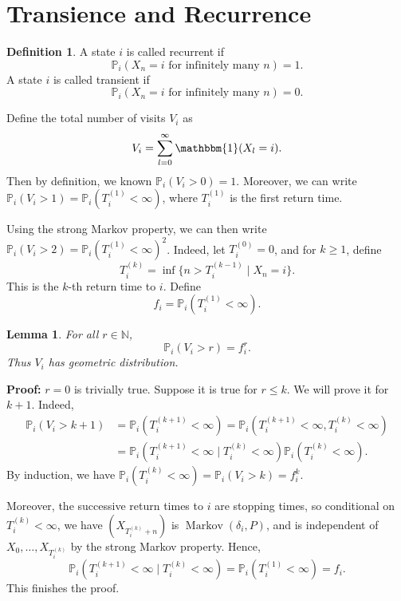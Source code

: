 \documentclass[12pt]{article}
\DeclareMathOperator{\Mkv}{Markov}
\newtheorem{lemma}{Lemma}[section]
\theoremstyle{definition}
\newtheorem{definition}{Definition}[section]
\theoremstyle{remark}
\begin{document}
\section{Transience and Recurrence}%
\label{sec:transience_and_recurrence}

\begin{definition}
	A state $i$ is called recurrent if
	\[
		\mathbb{P}_i(X_n = i \text{ for infinitely many } n) = 1
	.\]
	A state $i$ is called transient if
	\[
		\mathbb{P}_i(X_n = i \text{ for infinitely many } n) = 0
	.\]
\end{definition}

Define the total number of visits $V_i$ as
\[
	V_i = \sum_{l = 0}^{\infty} \mathbbm{1}(X_l = i)
.\]
Then by definition, we known $\mathbb{P}_i(V_i > 0) = 1$. Moreover, we can write $\mathbb{P}_i(V_i > 1) = \mathbb{P}_i(T_i^{(1)} < \infty)$, where $T_i^{(1)}$ is the first return time.

Using the strong Markov property, we can then write $\mathbb{P}_i(V_i > 2) = \mathbb{P}_i(T_i^{(1)} < \infty)^2$. Indeed, let $T_i^{(0)} = 0$, and for $k \geq 1$, define 
\[
	T_i^{(k)} = \inf\{n > T_i^{(k-1)} \mid X_n = i\}
.\]
This is the $k$-th return time to $i$. Define
\[
	f_i = \mathbb{P}_i(T_i^{(1)} < \infty)
.\]

\begin{lemma}
	For all $r \in \mathbb{N}$,
	\[
		\mathbb{P}_i(V_i > r) = f_i^{r}
	.\]
	Thus $V_i$ has geometric distribution.
\end{lemma}

\begin{adjustbox}{minipage = \columnwidth - 25.5pt, margin=1em, frame=1pt, margin=0em}
\textbf{Proof:} $r = 0$ is trivially true. Suppose it is true for $r \leq k$. We will prove it for $k + 1$. Indeed,
\begin{align*}
	\mathbb{P}_i(V_i > k+1) &= \mathbb{P}_i(T_i^{(k+1)} < \infty) = \mathbb{P}_i(T_i^{(k+1)}< \infty, T_i^{(k)} < \infty) \\
				&= \mathbb{P}_i(T_i^{(k+1)} < \infty \mid T_i^{(k)} < \infty) \mathbb{P}_i(T_i^{(k)} < \infty).
\end{align*}
By induction, we have $\mathbb{P}_i(T_i^{(k)} < \infty) = \mathbb{P}_i(V_i > k) = f_i^{k}$.

Moreover, the successive return times to $i$ are stopping times, so conditional on $T_i^{(k)} < \infty$, we have $(X_{T_i^{(k)} + n})$ is $\Mkv(\delta_i, P)$, and is independent of $X_0, \ldots, X_{T_i^{(k)}}$ by the strong Markov property. Hence,
\[
	\mathbb{P}_i(T_i^{(k+1)} < \infty \mid T_i^{(k)} < \infty) = \mathbb{P}_i(T_i^{(1)} < \infty) = f_i
.\]
This finishes the proof.
\end{adjustbox}
\end{document}
